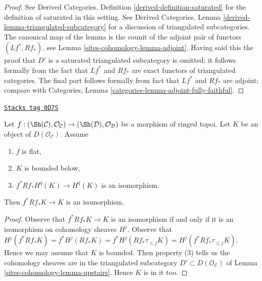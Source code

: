\begin{proof}
See Derived Categories, Definition \ref{derived-definition-saturated}
for the definition of saturated in this setting. See
Derived Categories, Lemma \ref{derived-lemma-triangulated-subcategory}
for a discussion of triangulated subcategories.
The canonical map of the lemma is the counit of the adjoint
pair of functors $(Lf^*, Rf_*)$, see Lemma \ref{sites-cohomology-lemma-adjoint}.
Having said this the proof that $D'$ is a saturated triangulated subcategory
is omitted; it follows formally from the fact that
$Lf^*$ and $Rf_*$ are exact functors of triangulated categories.
The final part follows formally from
fact that $Lf^*$ and $Rf_*$ are adjoint; compare with
Categories, Lemma \ref{categories-lemma-adjoint-fully-faithful}.
\end{proof}

\begin{lemma}
\label{sites-cohomology-lemma-bounded-in-image-upstairs}
\href{https://stacks.math.columbia.edu/tag/0D7S}{\texttt{Stacks tag 0D7S}}

Let $f : (\Sh(\mathcal{C}), \mathcal{O}_\mathcal{C}) \to
(\Sh(\mathcal{D}), \mathcal{O}_\mathcal{D})$ be a morphism of ringed topoi.
Let $K$ be an object of $D(\mathcal{O}_\mathcal{C})$. Assume
\begin{enumerate}
\item $f$ is flat,
\item $K$ is bounded below,
\item $f^*Rf_*H^q(K) \to H^q(K)$ is an isomorphism.
\end{enumerate}
Then $f^*Rf_*K \to K$ is an isomorphism.
\end{lemma}

\begin{proof}
Observe that $f^*Rf_*K \to K$ is an isomorphism if and only
if it is an isomorphism on cohomology sheaves $H^j$. Observe that
$H^j(f^*Rf_*K) = f^*H^j(Rf_*K) = f^*H^j(Rf_*\tau_{\leq j}K) =
H^j(f^*Rf_*\tau_{\leq j}K)$.
Hence we may assume that $K$ is bounded. Then property (3)
tells us the cohomology sheaves are in the triangulated
subcategory $D' \subset D(\mathcal{O}_\mathcal{C})$ of
Lemma \ref{sites-cohomology-lemma-upstairs}. Hence $K$ is in it too.
\end{proof}

